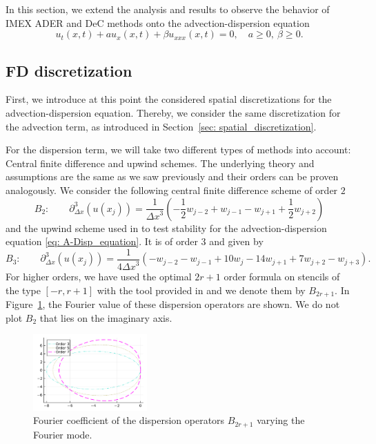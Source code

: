 In this section, we extend the analysis and results to observe the behavior of IMEX ADER and DeC methods onto the advection-dispersion equation
\begin{equation}
\label{eq: A-Disp_equation}
u_t(x,t) + au_x(x,t) + \beta u_{xxx}(x,t) = 0, \quad a\ge0, \ \beta \ge 0.
\end{equation}
\subsection{FD discretization}
\label{sec: disp_spatial_discretization}
First, we  introduce at this point the considered spatial discretizations for the advection-dispersion equation. Thereby, we consider the same discretization for the advection term, as introduced in Section~\ref{sec: spatial_discretization}.

For the dispersion term, we will take two different types of methods into account: Central finite difference and upwind schemes. The underlying theory and assumptions are the same as we saw previously and their orders can be proven analogously. We consider the following central finite difference scheme of order $2$ 
\begin{equation}
	\label{eq: CFD-schemes_third_deriv}
	B_2: \qquad\partial_{\Delta x}^3(u(x_j)) = \frac{1}{{\Delta x}^3}\left(-\frac{1}{2}w_{j-2} + w_{j-1} - w_{j+1} + \frac{1}{2}w_{j+2}\right)
\end{equation}
and the upwind scheme used in \cite{TanChenShu_ImEx_Stability} to test stability for the advection-dispersion equation \eqref{eq: A-Disp_equation}. It is of order 3 and given by
\begin{equation}
\label{eq: shu_upwind_dispersion}
B_3: \qquad\partial_{\Delta x}^3(u(x_j)) =\frac{1}{4{\Delta x}^3}\left( -w_{j-2} - w_{j-1}  + 10w_{j} - 14w_{j+1} + 7w_{j+2} - w_{j+3}\right).
\end{equation}
For higher orders, we have used the optimal $2r+1$ order formula on stencils of the type $[-r,r+1]$ with the tool provided in \cite{fdcc} and we denote them by $B_{2r+1}$. In Figure~\ref{fig:eig_disp}, the Fourier value of these dispersion operators are shown. We do not plot $B_2$ that lies on the imaginary axis. 
\begin{figure}
	\centering
	\includegraphics[width=0.39\textwidth]{pdf/pdepics/disp/eig_disp_oper_all.pdf}
	\caption{Fourier coefficient of the dispersion operators $B_{2r+1}$ varying the Fourier mode.}\label{fig:eig_disp}
\end{figure}
